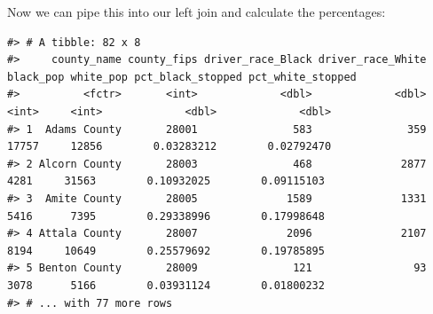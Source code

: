 \documentclass[]{book}
\newenvironment{Shaded}{\begin{snugshade}}{\end{snugshade}}
\newcommand{\KeywordTok}[1]{\textcolor[rgb]{0.13,0.29,0.53}{\textbf{#1}}}
\newcommand{\DataTypeTok}[1]{\textcolor[rgb]{0.13,0.29,0.53}{#1}}
\newcommand{\DecValTok}[1]{\textcolor[rgb]{0.00,0.00,0.81}{#1}}
\newcommand{\StringTok}[1]{\textcolor[rgb]{0.31,0.60,0.02}{#1}}
\newcommand{\CommentTok}[1]{\textcolor[rgb]{0.56,0.35,0.01}{\textit{#1}}}
\newcommand{\OtherTok}[1]{\textcolor[rgb]{0.56,0.35,0.01}{#1}}
\newcommand{\OperatorTok}[1]{\textcolor[rgb]{0.81,0.36,0.00}{\textbf{#1}}}
\newcommand{\NormalTok}[1]{#1}
\theoremstyle{definition}
\theoremstyle{definition}
\theoremstyle{definition}
\theoremstyle{remark}
\begin{document}
Now we can pipe this into our left join and calculate the percentages:

\begin{Shaded}
\end{Shaded}

\begin{verbatim}
#> # A tibble: 82 x 8
#>     county_name county_fips driver_race_Black driver_race_White black_pop white_pop pct_black_stopped pct_white_stopped
#>          <fctr>       <int>             <dbl>             <dbl>     <int>     <int>             <dbl>             <dbl>
#> 1  Adams County       28001               583               359     17757     12856        0.03283212        0.02792470
#> 2 Alcorn County       28003               468              2877      4281     31563        0.10932025        0.09115103
#> 3  Amite County       28005              1589              1331      5416      7395        0.29338996        0.17998648
#> 4 Attala County       28007              2096              2107      8194     10649        0.25579692        0.19785895
#> 5 Benton County       28009               121                93      3078      5166        0.03931124        0.01800232
#> # ... with 77 more rows
\end{verbatim}
\end{document}
